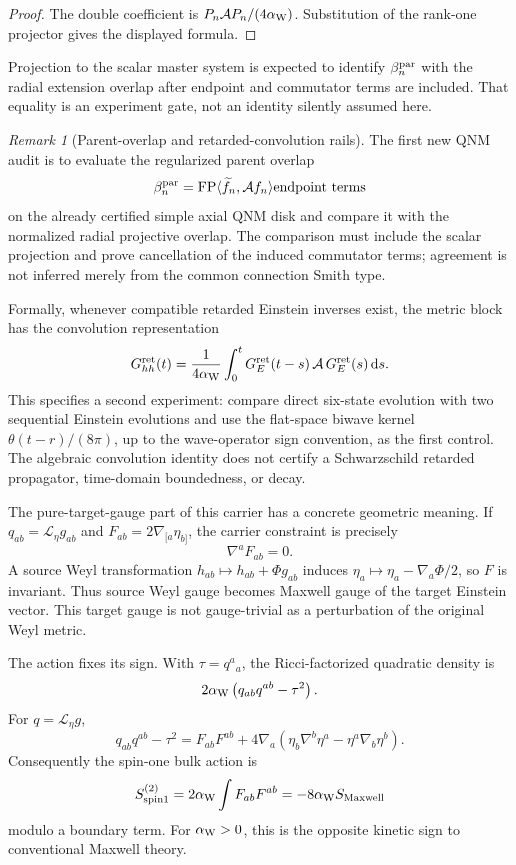 \documentclass[11pt]{article}
\theoremstyle{definition}
\theoremstyle{remark}
\newtheorem{remark}[theorem]{Remark}
\newcommand{\dd}{\mathrm d}
\begin{document}
\begin{proof}
The double coefficient is \(P_n\mathcal AP_n/(4\alpha_{\rm W})\).
Substitution of the rank-one projector gives the displayed formula.
\end{proof}

Projection to the scalar master system is expected to identify
\(\beta_n^{\rm par}\) with the radial extension overlap after endpoint and
commutator terms are included.  That equality is an experiment gate, not an
identity silently assumed here.

\begin{remark}[Parent-overlap and retarded-convolution rails]
\label{rem:parent-experiments}
The first new QNM audit is to evaluate the regularized parent overlap
\[
\beta_n^{\rm par}
=\operatorname{FP}\langle\widetilde f_n,\mathcal Af_n\rangle
\text{endpoint terms}
\]
on the already certified simple axial QNM disk and compare it with the
normalized radial projective overlap.  The comparison must include the
scalar projection and prove cancellation of the induced commutator terms;
agreement is not inferred merely from the common connection Smith type.

Formally, whenever compatible retarded Einstein inverses exist, the metric
block has the convolution representation
\[
G_{hh}^{\rm ret}(t)
=\frac1{4\alpha_{\rm W}}
\int_0^t
G_E^{\rm ret}(t-s)\,
\mathcal A\,
G_E^{\rm ret}(s)\,\dd s .
\]
This specifies a second experiment: compare direct six-state evolution with
two sequential Einstein evolutions and use the flat-space biwave kernel
\(\theta(t-r)/(8\pi)\), up to the wave-operator sign convention, as the
first control.  The algebraic convolution identity does not certify a
Schwarzschild retarded propagator, time-domain boundedness, or decay.
\end{remark}

The pure-target-gauge part of this carrier has a concrete geometric meaning.
If \(q_{ab}=\mathcal L_\eta g_{ab}\) and
\(F_{ab}=2\nabla_{[a}\eta_{b]}\), the carrier constraint is precisely
\[
\nabla^aF_{ab}=0.
\]
A source Weyl transformation \(h_{ab}\mapsto h_{ab}+\Phi g_{ab}\) induces
\(\eta_a\mapsto\eta_a-\nabla_a\Phi/2\), so \(F\) is invariant.  Thus source
Weyl gauge becomes Maxwell gauge of the target Einstein vector.  This target
gauge is not gauge-trivial as a perturbation of the original Weyl metric.

The action fixes its sign.  With \(\tau=q^a{}_a\), the Ricci-factorized
quadratic density is
\[
2\alpha_{\rm W}\left(q_{ab}q^{ab}-\tau^2\right).
\]
For \(q=\mathcal L_\eta g\),
\[
q_{ab}q^{ab}-\tau^2
=
F_{ab}F^{ab}
+4\nabla_a\!\left(
\eta_b\nabla^b\eta^a-\eta^a\nabla_b\eta^b
\right).
\]
Consequently the spin-one bulk action is
\[
S^{(2)}_{\rm spin1}
=2\alpha_{\rm W}\int F_{ab}F^{ab}
=-8\alpha_{\rm W}S_{\rm Maxwell}
\]
modulo a boundary term.  For \(\alpha_{\rm W}>0\), this is the opposite
kinetic sign to conventional Maxwell theory.
\end{document}
